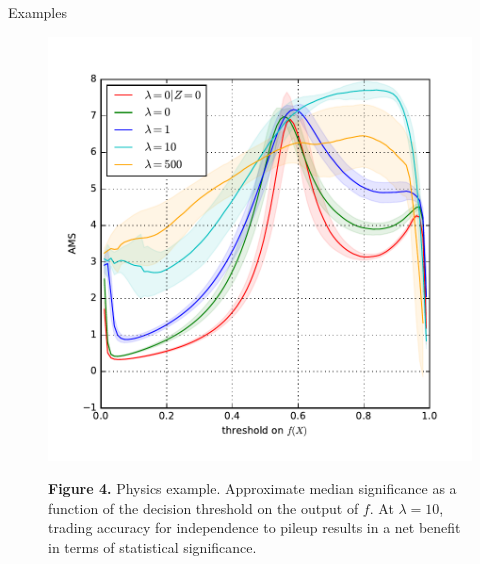 \documentclass[final,unknownkeysallowed]{beamer}
\begin{document}
\begin{frame}{}
\begin{textblock}{0.32}
\begin{block}{Examples \phantom{p}}
\begin{figure}
\begin{minipage}{.42\linewidth}
    \begin{center}
        \includegraphics[width=\textwidth]{figures/ams.pdf}\vspace{-1em}
    \end{center}
        {\bf Figure 4.} Physics example. Approximate median significance as a function of the decision threshold
        on the output of $f$. At $\lambda=10$, {\color{red} trading
        accuracy for independence to pileup
        results in a net benefit in terms of statistical significance}.
\end{minipage}
\end{figure}


\end{block}
\end{textblock}
\end{frame}
\end{document}
